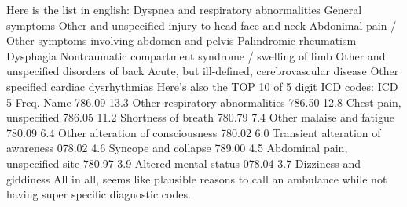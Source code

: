 Here is the list in english:\markdownRendererInterblockSeparator
{}\markdownRendererOlBeginTight
{}Dyspnea and respiratory abnormalities\markdownRendererOlItemEnd 
{}General symptoms\markdownRendererOlItemEnd 
{}Other and unspecified injury to head face and neck\markdownRendererOlItemEnd 
{}Abdonimal pain / Other symptoms involving abdomen and pelvis\markdownRendererOlItemEnd 
{}Palindromic rheumatism\markdownRendererOlItemEnd 
{}Dysphagia\markdownRendererOlItemEnd 
{}Nontraumatic compartment syndrome / swelling of limb\markdownRendererOlItemEnd 
{}Other and unspecified disorders of back\markdownRendererOlItemEnd 
{}Acute, but ill-defined, cerebrovascular disease\markdownRendererOlItemEnd 
{}Other specified cardiac dysrhythmias\markdownRendererOlItemEnd 
\markdownRendererOlEndTight \markdownRendererInterblockSeparator
{}Here's also the TOP 10 of 5 digit ICD codes:\markdownRendererInterblockSeparator
{}ICD 5 Freq. Name 786.09 13.3 Other respiratory abnormalities 786.50 12.8\markdownRendererPercentSign{} Chest pain, unspecified 786.05 11.2\markdownRendererPercentSign{} Shortness of breath 780.79 7.4\markdownRendererPercentSign{} Other malaise and fatigue 780.09 6.4\markdownRendererPercentSign{} Other alteration of consciousness 780.02 6.0\markdownRendererPercentSign{} Transient alteration of awareness 078.02 4.6\markdownRendererPercentSign{} Syncope and collapse 789.00 4.5\markdownRendererPercentSign{} Abdominal pain, unspecified site 780.97 3.9\markdownRendererPercentSign{} Altered mental status 078.04 3.7\markdownRendererPercentSign{} Dizziness and giddiness\markdownRendererInterblockSeparator
{}All in all, seems like plausible reasons to call an ambulance while not having super specific diagnostic codes.\relax